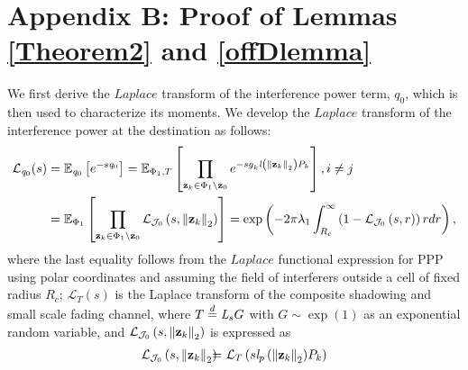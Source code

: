 \documentclass[12pt, draftclsnofoot, onecolumn]{IEEEtran}
\theoremstyle{plain}
\begin{document}
\section*{Appendix B: Proof of Lemmas \ref{Theorem2} and \ref{offDlemma}}\label{APPx2}\vspace{-.05in}%
We first derive the $Laplace$ transform of the interference power term, $\mathit{{q}}_{0}$, which is then used to characterize its moments. 
We develop the $Laplace$ transform of the interference power at the destination as follows: %
%
\begin{align}\label{App1}
\mathcal{L}_{\mathit{{q}}_{0}} (s)&
%
=\mathbb{E}_{\mathit{{q}}_{0}} \left[e^{-s \mathit{{q}}_{0}} \right] %
%
=\mathbb{E}_{\Phi_1, T} \left[ \prod_{\mathbf{z}_k \in \Phi_1  \setminus \mathbf{z}_0}  { e^{ -s {  {g}_{k}^{} {\mathit{l} \left({\Vert \bold{z}_k \Vert}_2\right)} P_{k}                 }  }  } \right], i \ne j \nonumber\\
\!\!\!\!\!\!\!\!\!\!\!\!\!\!\!\!\!\!\!\!\!\!\!\!&=\mathbb{E}_{\Phi_1} \left[ \prod_{\mathbf{z}_k \in \Phi_1  \setminus \mathbf{z}_0} \mathcal{L}_{\mathcal{J}_{0}} \left(s,{\Vert \bold{z}_k \Vert}_2 \right)  \right]
=\exp \left( {-2\pi\lambda_1 \int_{R_c}^\infty {\left( 1- \mathcal{L}_{\mathcal{J}_{0}}\left(s,r\right) \right) r dr}} \right),
\end{align}
%
where the last equality follows from the $Laplace$ functional expression for PPP using polar coordinates and assuming the field of interferers outside a cell of fixed radius $R_c$; %
$ \mathcal{L}_{T}(s) $ is the Laplace transform of the composite shadowing and small scale fading channel, where $ T \buildrel d \over = \mathit{L}_{s} G$ with $G \sim \exp(1)$ as an exponential random variable, and $ \mathcal{L}_{\mathcal{J}_{0}}\left(s,{\Vert \bold{z}_k \Vert}_2\right) $ is expressed as %
%
%
\begin{eqnarray}
\mathcal{L}_{\mathcal{J}_{0}} \left(s,{\Vert \bold{z}_k \Vert}_2 \right)
&\!\!\!\!=&\!\!\!\!    \mathcal{L}_{T}  \left( { s {   {\mathit{l}_{p}\left({\Vert \bold{z}_k \Vert}_2\right)} P_{k} }} \right)  \label{eq29a}
\end{eqnarray}
%
%
\end{document}
